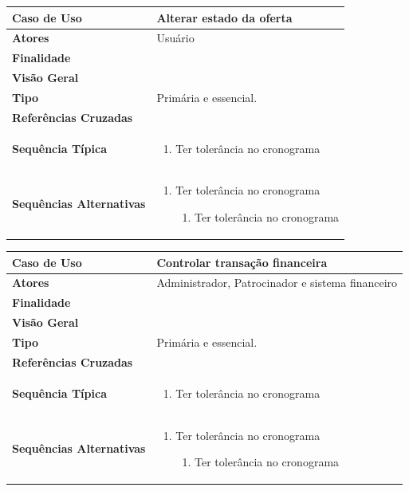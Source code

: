 \documentclass[a4paper,11pt]{article}
\begin{document}
\begin{table}[H]
		\begin{tabularx}{\textwidth}{|l|X|}
		\hline
			\textbf{Caso de Uso} &  Alterar estado da oferta \\ \hline
			\textbf{Atores} &  Usuário  \\ \hline
			\textbf{Finalidade} &   \\ \hline
			\textbf{Visão Geral} &  \\ \hline
			\textbf{Tipo} & Primária e essencial. \\ \hline
			\textbf{Referências Cruzadas} &  \\ \hline
			\textbf{Sequência Típica} & 
			\begin{enumerate}
			\item Ter tolerância no cronograma
			\end{enumerate} \\ \hline
			\textbf{Sequências Alternativas} & 
			\begin{enumerate}
			\item Ter tolerância no cronograma
			\begin{enumerate}
			\item Ter tolerância no cronograma
			\end{enumerate}
			\end{enumerate} \\ \hline
		\end{tabularx}
\end{table}

\begin{table}[H]
		\begin{tabularx}{\textwidth}{|l|X|}
		\hline
			\textbf{Caso de Uso} &  Controlar transação financeira \\ \hline
			\textbf{Atores} &  Administrador, Patrocinador e sistema financeiro  \\ \hline
			\textbf{Finalidade} &   \\ \hline
			\textbf{Visão Geral} &  \\ \hline
			\textbf{Tipo} & Primária e essencial. \\ \hline
			\textbf{Referências Cruzadas} &  \\ \hline
			\textbf{Sequência Típica} & 
			\begin{enumerate}
			\item Ter tolerância no cronograma
			\end{enumerate} \\ \hline
			\textbf{Sequências Alternativas} & 
			\begin{enumerate}
			\item Ter tolerância no cronograma
			\begin{enumerate}
			\item Ter tolerância no cronograma
			\end{enumerate}
			\end{enumerate} \\ \hline
		\end{tabularx}
\end{table}
\end{document}
